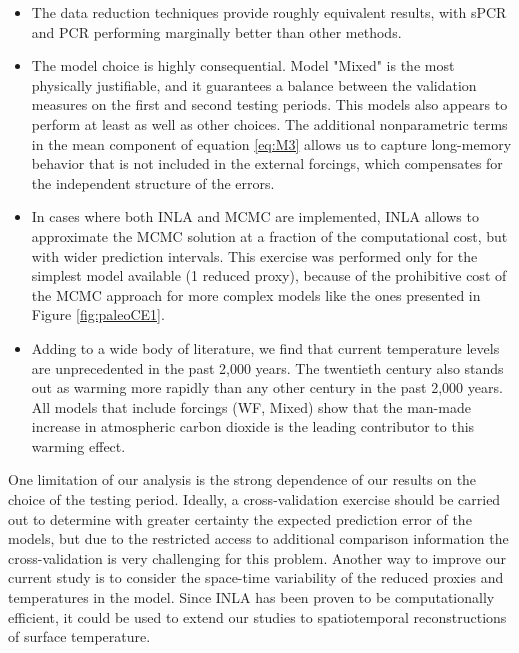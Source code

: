 \documentclass[12pt]{amsart}
\theoremstyle{plain}
\theoremstyle{definition}
\theoremstyle{remark}
\begin{document}
\begin{itemize}
    \item The data reduction techniques provide roughly equivalent results, with
      sPCR and PCR performing marginally better than other methods.
    \item The model choice is highly consequential. Model "Mixed" is the most
      physically justifiable, and it guarantees a balance between the
      validation measures on the first and second testing periods. This models also
      appears to perform at least as well as other choices. The 
      additional nonparametric terms in the mean component of equation \eqref{eq:M3} allows us
      to capture long-memory behavior that is not included in the external forcings, which compensates for the independent structure of the errors. 
    \item In cases where both INLA and MCMC are implemented, INLA allows to approximate the MCMC
      solution at a fraction of the computational cost, but with wider
      prediction intervals. This exercise was performed only for the simplest
      model available (1 reduced proxy), because of the prohibitive cost of the
      MCMC approach for more complex models like the ones presented in Figure
      \ref{fig:paleoCE1}. 
    \item Adding to a wide body of literature, we find that current temperature levels are unprecedented in the past 2,000 years. 
      The twentieth century also stands out as warming more rapidly than any other
      century in the past 2,000 years. All models that include forcings (WF, Mixed) show that the man-made increase in atmospheric carbon dioxide is the leading contributor to this
      warming effect. 
\end{itemize}

One limitation of our analysis is the strong
dependence of our results on the choice of the testing period. Ideally, a
cross-validation exercise should be carried out to determine with greater
certainty the expected prediction error of the models, but due to the restricted access to
additional comparison information the cross-validation is very challenging for this problem. 
Another way to improve our current study is to consider the space-time variability of the reduced proxies and temperatures in the model. 
Since INLA has been proven to be computationally
efficient, it could be used to extend our studies to spatiotemporal reconstructions of surface temperature.
\end{document}
